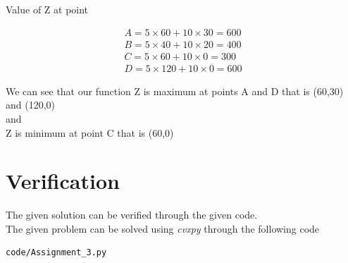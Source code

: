 Value of Z at point

\begin{align*}
     A= 5\times 60 + 10 \times 30 =600
\\
     B= 5\times 40 + 10 \times 20 =400
\\
     C= 5\times 60 + 10 \times 0 =300
\\
     D= 5\times 120 + 10 \times 0 =600
\end{align*}

We can see that our function Z is maximum at points A and D that is (60,30) and (120,0)\\
and\\
Z is minimum at point C that is (60,0)\\
%
\section{Verification}
The given solution can be verified through the given code.\\
The given problem can be solved using {\em cvxpy} through the following code
\begin{lstlisting}
code/Assignment_3.py
\end{lstlisting}
